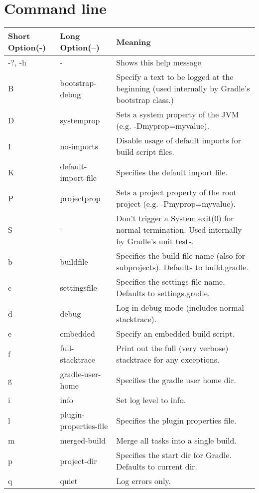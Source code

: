 \chapter{Command line} %
\label{cha:command_line}

\begin{table}
\begin{center}
\begin{tabular}{l|l|l}
\textbf{Short Option}(-) & \textbf{Long Option}(--) & \textbf{Meaning}\\ \hline
-?, -h  & -           & Shows this help message\\
B & bootstrap-debug & Specify a text to be logged at the beginning (used internally by Gradle's bootstrap class.)\\
D & systemprop       & Sets a system property of the JVM (e.g. -Dmyprop=myvalue).\\ 
I & no-imports        & Disable usage of default imports for build script files.\\
K & default-import-file & Specifies the default import file.\\ 
P & projectprop  & Sets a project property of the root project (e.g. -Pmyprop=myvalue).\\
S & - & Don't trigger a System.exit(0) for normal termination. Used internally by Gradle's unit tests.\\
b & buildfile        & Specifies the build file name (also for subprojects). Defaults to build.gradle.\\
c & settingsfile     & Specifies the settings file name. Defaults to settings.gradle.\\
d & debug            & Log in debug mode (includes normal stacktrace).\\
e & embedded         & Specify an embedded build script.\\
f & full-stacktrace  & Print out the full (very verbose) stacktrace for any exceptions.\\
g & gradle-user-home & Specifies the gradle user home dir.\\
i & info             & Set log level to info.\\
l & plugin-properties-file & Specifies the plugin properties file.\\
m & merged-build     & Merge all tasks into a single build.\\
p & project-dir      & Specifies the start dir for Gradle. Defaults to current dir.\\
q & quiet            & Log errors only.\\

\end{tabular}
\end{center}
\end{table}
